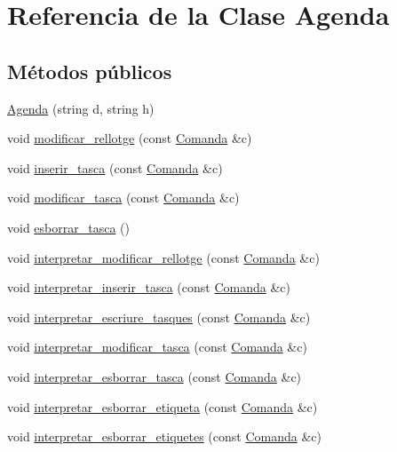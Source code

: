 \hypertarget{class_agenda}{\section{Referencia de la Clase Agenda}
\label{class_agenda}
}
\subsection*{Métodos públicos}
\begin{DoxyCompactItemize}
\item 
\hyperlink{class_agenda_a5c7b532b714bfbbe10e6be529160b45b}{Agenda} (string d, string h)
\item 
void \hyperlink{class_agenda_a9682676ce90d55251713aaf5d155f170}{modificar\-\_\-rellotge} (const \hyperlink{class_comanda}{Comanda} \&c)
\item 
void \hyperlink{class_agenda_a059521520bbff1406580f43870b7e6b0}{inserir\-\_\-tasca} (const \hyperlink{class_comanda}{Comanda} \&c)
\item 
void \hyperlink{class_agenda_a71ed63bb50f305d366ec34fe040de8e6}{modificar\-\_\-tasca} (const \hyperlink{class_comanda}{Comanda} \&c)
\item 
void \hyperlink{class_agenda_a5859536c0a5cf6aad7fa0a89049b6220}{esborrar\-\_\-tasca} ()
\item 
void \hyperlink{class_agenda_aabd932aa3bf3d31c8b285c1df820cb03}{interpretar\-\_\-modificar\-\_\-rellotge} (const \hyperlink{class_comanda}{Comanda} \&c)
\item 
void \hyperlink{class_agenda_ae0fbad6af5d4132169b2daadacb8ea42}{interpretar\-\_\-inserir\-\_\-tasca} (const \hyperlink{class_comanda}{Comanda} \&c)
\item 
void \hyperlink{class_agenda_ac09bb2bf7cf5d1d6d4c30d4c021ada34}{interpretar\-\_\-escriure\-\_\-tasques} (const \hyperlink{class_comanda}{Comanda} \&c)
\item 
void \hyperlink{class_agenda_a02f6c89125af8bc3f4851ce169dd5f73}{interpretar\-\_\-modificar\-\_\-tasca} (const \hyperlink{class_comanda}{Comanda} \&c)
\item 
void \hyperlink{class_agenda_a07ef0637cc544831204b75d7e03f75f5}{interpretar\-\_\-esborrar\-\_\-tasca} (const \hyperlink{class_comanda}{Comanda} \&c)
\item 
void \hyperlink{class_agenda_a77526b8f1b285b6e6d948454c80ed4d4}{interpretar\-\_\-esborrar\-\_\-etiqueta} (const \hyperlink{class_comanda}{Comanda} \&c)
\item 
void \hyperlink{class_agenda_a3d8966a287c2eeb1764d5ebe7029724a}{interpretar\-\_\-esborrar\-\_\-etiquetes} (const \hyperlink{class_comanda}{Comanda} \&c)

\end{DoxyCompactItemize}
